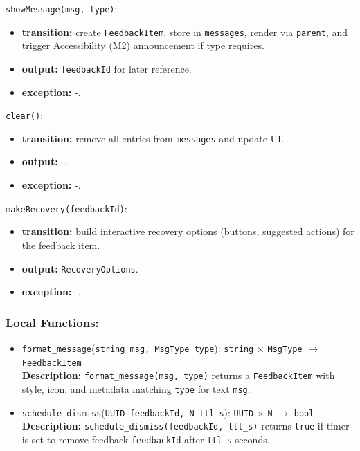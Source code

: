 \documentclass[12pt, titlepage]{article}
\begin{document}
\noindent\texttt{showMessage(msg, type)}:
\begin{itemize}
  \item \textbf{transition:} create \texttt{FeedbackItem}, store in \texttt{messages}, render via \texttt{parent}, and trigger Accessibility (\hyperref[M2]{M2}) announcement if type requires.
  \item \textbf{output:} \texttt{feedbackId} for later reference.
  \item \textbf{exception:} -.
\end{itemize}

\noindent\texttt{clear()}:
\begin{itemize}
  \item \textbf{transition:} remove all entries from \texttt{messages} and update UI.
  \item \textbf{output:} -.
  \item \textbf{exception:} -.
\end{itemize}

\noindent\texttt{makeRecovery(feedbackId)}:
\begin{itemize}
  \item \textbf{transition:} build interactive recovery options (buttons, suggested actions) for the feedback item.
  \item \textbf{output:} \texttt{RecoveryOptions}.
  \item \textbf{exception:} -.
\end{itemize}

\subsubsection{Local Functions:}
\begin{itemize}
  \item \texttt{format\_message}(\texttt{string msg, MsgType type}): \texttt{string} $\times$ \texttt{MsgType} $\rightarrow$ \texttt{FeedbackItem} \\
  \textbf{Description:} \texttt{format\_message(msg, type)} returns a \texttt{FeedbackItem} with style, icon, and metadata matching \texttt{type} for text \texttt{msg}.

  \item \texttt{schedule\_dismiss}(\texttt{UUID feedbackId, N ttl\_s}): \texttt{UUID} $\times$ \texttt{N} $\rightarrow$ \texttt{bool} \\
  \textbf{Description:} \texttt{schedule\_dismiss(feedbackId, ttl\_s)} returns \texttt{true} if timer is set to remove feedback \texttt{feedbackId} after \texttt{ttl\_s} seconds.
\end{itemize}
\end{document}
